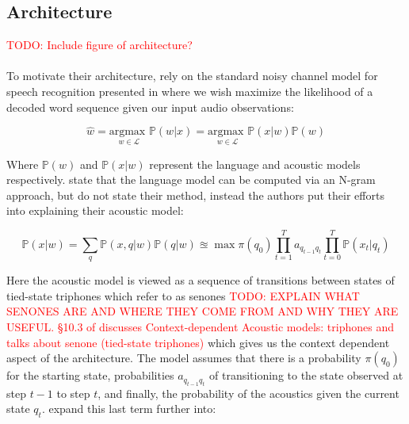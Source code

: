 \documentclass[letterpaper]{article}
\newcommand{\TODO}[1]{\textcolor{red}{TODO: #1}}
\newcommand{\argmax}[1]{\underset{#1}{\text{argmax }}}
\newcommand{\cprob}[2]{ \prob{#1 \lvert #2} }
\newcommand{\prob}[1]{\mathbb{P}\left( #1 \right)}
\begin{document}
\subsection*{Architecture}

\TODO{Include figure of architecture?}

\paragraph{} To motivate their architecture, \cite{DBLP:journals/taslp/DahlYDA12} rely on the standard noisy channel model for speech recognition presented in \cite{jurafskyMartin} where we wish maximize the likelihood of a decoded word sequence given our input audio observations:

\begin{equation}
\hat{w} = \argmax{w \in \mathscr{L}} \cprob{w}{x} = \argmax{w \in \mathscr{L}} \cprob{x}{w} \prob{w} 
\label{eqn:asr:def}
\end{equation}

Where $\prob{w}$ and $\cprob{x}{w}$ represent the language and acoustic models respectively. \cite{jurafskyMartin} state that the language model can be computed via an N-gram approach, but \cite{DBLP:journals/taslp/DahlYDA12} do not state their method, instead the authors put their efforts into explaining their acoustic model:

\begin{equation}
\cprob{x}{w} = \sum_{q} \cprob{x,q}{w} \cprob{q}{w} \approxeq \max \pi(q_0) \prod_{t = 1}^T a_{q_{t-1} q_t} \prod_{t=0}^T \cprob{x_t}{q_t} 
\label{eqn:lm:def}
\end{equation}

Here the acoustic model is viewed as a sequence of transitions between states of tied-state triphones which \cite{DBLP:journals/taslp/DahlYDA12} refer to as senones \TODO{EXPLAIN WHAT SENONES ARE AND WHERE THEY COME FROM AND WHY THEY ARE USEFUL. \S 10.3 of \cite{jurafskyMartin} discusses Context-dependent Acoustic models: triphones and \cite{DBLP:conf/interspeech/2014} talks about senone (tied-state triphones)} which gives us the context dependent aspect of the architecture. The model assumes that there is a probability $\pi(q_0)$ for the starting state, probabilities $a_{q_{t-1} q_{t}}$ of transitioning to the state observed at step $t -1$ to step $t$, and finally, the probability of the acoustics given the current state $q_t$. \cite{DBLP:journals/taslp/DahlYDA12} expand this last term further into:
\end{document}
